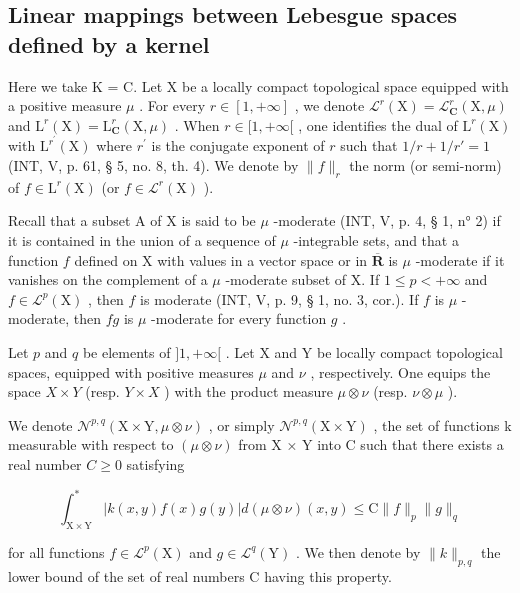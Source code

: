 \subsection{Linear mappings between Lebesgue spaces defined by a kernel}

Here we take K = C. Let X be a locally compact topological space equipped with a positive measure \(\mu\) . For every \(r \in [1, +\infty]\) , we denote \(\mathcal{L}^r (\mathrm{X}) = \mathcal{L}_{\mathbf{C}}^r (\mathrm{X},\mu)\) and \(\mathrm{L}^r (\mathrm{X}) = \mathrm{L}_{\mathbf{C}}^r (\mathrm{X},\mu)\) . When \(r\in [1, + \infty [\) , one identifies the dual of \(\mathrm{L}^r (\mathrm{X})\) with \(\mathrm{L}^{r^{\prime}}(\mathrm{X})\) where \(r^\prime\) is the conjugate exponent of \(r\) such that \(1 / r + 1 / r' = 1\) (INT, V, p. 61, § 5, no. 8, th. 4). We denote by \(\| f\| _r\) the norm (or semi-norm) of \(f\in \mathrm{L}^r (\mathrm{X})\) (or \(f\in \mathcal{L}^r (\mathrm{X})\) ).

Recall that a subset A of X is said to be \(\mu\) -moderate (INT, V, p. 4, § 1, n° 2) if it is contained in the union of a sequence of \(\mu\) -integrable sets, and that a function \(f\) defined on X with values in a vector space or in \(\overline{\mathbf{R}}\) is \(\mu\) -moderate if it vanishes on the complement of a \(\mu\) -moderate subset of X. If \(1 \leqslant p < +\infty\) and \(f \in \mathcal{L}^p(\mathrm{X})\) , then \(f\) is moderate (INT, V, p. 9, § 1, no. 3, cor.). If \(f\) is \(\mu\) -moderate, then \(fg\) is \(\mu\) -moderate for every function \(g\) .

Let \(p\) and \(q\) be elements of \(]1, +\infty[\) . Let X and Y be locally compact topological spaces, equipped with positive measures \(\mu\) and \(\nu\) , respectively. One equips the space \(X \times Y\) (resp. \(Y \times X\) ) with the product measure \(\mu \otimes \nu\) (resp. \(\nu \otimes \mu\) ).

We denote \(\mathcal{N}^{p,q}(\mathrm{X}\times\mathrm{Y},\mu\otimes\nu)\) , or simply \(\mathcal{N}^{p,q}(\mathrm{X}\times\mathrm{Y})\) , the set of functions k measurable with respect to \((\mu\otimes\nu)\) from X × Y into C such that there exists a real number \(C\geqslant0\) satisfying

\[
\int_ {\mathrm{X} \times \mathrm{Y}} ^ {*} | k (x, y) f (x) g (y) | d (\mu \otimes \nu) (x, y) \leqslant \mathrm{C} \| f \| _ {p} \| g \| _ {q}\tag{2}
\]

for all functions \(f \in \mathcal{L}^p(\mathrm{X})\) and \(g \in \mathcal{L}^q(\mathrm{Y})\) . We then denote by \(\| k \|_{p,q}\) the lower bound of the set of real numbers C having this property.

